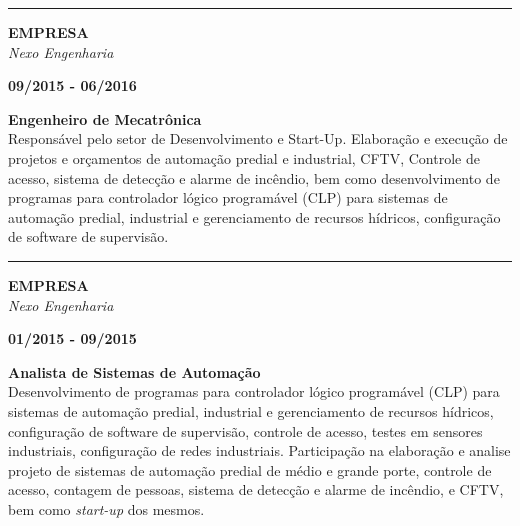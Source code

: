 \documentclass[12pt, a4paper]{article}
\newcommand{\LlinhaM}{1pt} 	 %
\newcommand{\TlinhaM}{17cm}		 %
\begin{document}
\begin{center} %
	\rule{\TlinhaM}{\LlinhaM}
\end{center}

\begin{multicols}{2}
	\begin{flushleft}
		\textbf{EMPRESA}\\
		\textit{Nexo Engenharia}\\
	\end{flushleft}
	\vfill
	\begin{flushright}
		\textbf{09/2015 - 06/2016}\\
	\end{flushright}
\end{multicols}
\begin{flushleft}
	\textbf{Engenheiro de Mecatrônica}\\
	Responsável pelo setor de Desenvolvimento e Start-Up. Elaboração e execução de projetos e orçamentos de automação predial e industrial, CFTV, Controle de acesso, sistema de detecção e alarme de incêndio, bem como desenvolvimento de programas para controlador lógico programável (CLP) para sistemas de automação predial, industrial e gerenciamento de recursos hídricos, configuração de software de supervisão.\\
\end{flushleft}

\begin{center}%
	\rule{\TlinhaM}{\LlinhaM}
\end{center}

\begin{multicols}{2}
	\begin{flushleft}
		\textbf{EMPRESA}\\
		\textit{Nexo Engenharia}\\
	\end{flushleft}
	\vfill
	\begin{flushright}
		\textbf{01/2015 - 09/2015}\\
	\end{flushright}
\end{multicols}
\begin{flushleft}
	\textbf{Analista de Sistemas de Automação}\\
	Desenvolvimento de programas para controlador lógico programável (CLP) para sistemas de automação predial, industrial e gerenciamento de recursos hídricos, 	configuração de software de supervisão, controle de acesso, testes em sensores industriais, configuração de redes industriais. Participação na elaboração e analise projeto de sistemas de automação predial de médio e grande porte, controle de acesso, contagem de pessoas, sistema de detecção e alarme de incêndio, e CFTV, bem como \textit{start-up} dos mesmos.\\
\end{flushleft}
\end{document}
